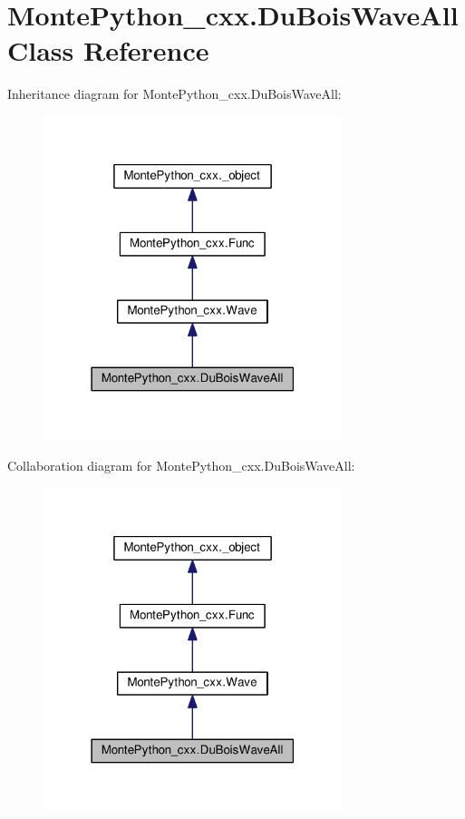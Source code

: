 \hypertarget{classMontePython__cxx_1_1DuBoisWaveAll}{}\section{Monte\+Python\+\_\+cxx.\+Du\+Bois\+Wave\+All Class Reference}
\label{classMontePython__cxx_1_1DuBoisWaveAll}


Inheritance diagram for Monte\+Python\+\_\+cxx.\+Du\+Bois\+Wave\+All\+:
\nopagebreak
\begin{figure}[H]
\begin{center}
\leavevmode
\includegraphics[width=247pt]{classMontePython__cxx_1_1DuBoisWaveAll__inherit__graph}
\end{center}
\end{figure}


Collaboration diagram for Monte\+Python\+\_\+cxx.\+Du\+Bois\+Wave\+All\+:
\nopagebreak
\begin{figure}[H]
\begin{center}
\leavevmode
\includegraphics[width=247pt]{classMontePython__cxx_1_1DuBoisWaveAll__coll__graph}
\end{center}
\end{figure}
